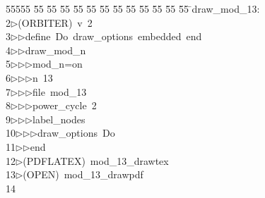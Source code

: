 %
%
\begin{tabbing}
55555 \= 55 \= 55 \= 55 \= 55 \= 55 \= 55 \= 55 \= 55 \= 55 \= 55 \= 55 \= 55 \= \>draw\_mod\_13:\\[0pt]
2\>$\triangleright$\>(ORBITER)\ v\ 2\ \\[0pt]
3\>$\triangleright$\>$\triangleright$\>define\ Do\ draw\_options\ embedded\ end\ \\[0pt]
4\>$\triangleright$\>$\triangleright$\>draw\_mod\_n\ \\[0pt]
5\>$\triangleright$\>$\triangleright$\>$\triangleright$\>mod\_n=on\ \\[0pt]
6\>$\triangleright$\>$\triangleright$\>$\triangleright$\>n\ 13\ \\[0pt]
7\>$\triangleright$\>$\triangleright$\>$\triangleright$\>file\ mod\_13\ \\[0pt]
8\>$\triangleright$\>$\triangleright$\>$\triangleright$\>power\_cycle\ 2\ \\[0pt]
9\>$\triangleright$\>$\triangleright$\>$\triangleright$\>label\_nodes\ \\[0pt]
10\>$\triangleright$\>$\triangleright$\>$\triangleright$\>draw\_options\ Do\ \\[0pt]
11\>$\triangleright$\>$\triangleright$\>end\\[0pt]
12\>$\triangleright$\>(PDFLATEX)\ mod\_13\_drawtex\\[0pt]
13\>$\triangleright$\>(OPEN)\ mod\_13\_drawpdf\\[0pt]
14\>\end{tabbing}
